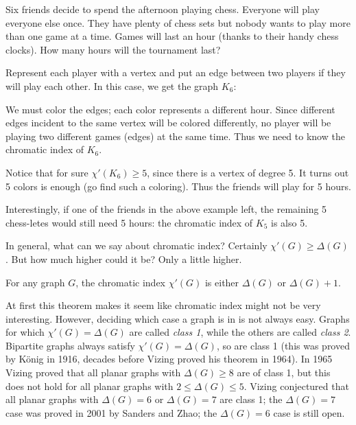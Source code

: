 \documentclass[12pt]{article}
\begin{document}
\begin{example}
Six friends decide to spend the afternoon playing chess.  Everyone will play everyone else once.  They have plenty of chess sets but nobody wants to play more than one game at a time.  Games will last an hour (thanks to their handy chess clocks).  How many hours will the tournament last?

\begin{solution}
Represent each player with a vertex and put an edge between two players if they will play each other.  In this case, we get the graph $K_6$:

\begin{center}
\end{center}

We must color the edges; each color represents a different hour.  Since different edges incident to the same vertex will be colored differently, no player will be playing two different games (edges) at the same time.  Thus we need to know the chromatic index of $K_6$.

Notice that for sure $\chi'(K_6) \ge 5$, since there is a vertex of degree 5. It turns out 5 colors is enough (go find such a coloring).  Thus the friends will play for 5 hours.  
\end{solution} 
\end{example}

Interestingly, if one of the friends in the above example left, the remaining 5 chess-letes would still need 5 hours: the chromatic index of $K_5$ is also 5.  

In general, what can we say about chromatic index?  Certainly $\chi'(G) \ge \Delta(G)$.  But how much higher could it be?  Only a little higher.

\begin{theorem}
For any graph $G$, the chromatic index $\chi'(G)$ is either $\Delta(G)$ or $\Delta(G) + 1$.
\end{theorem}

At first this theorem makes it seem like chromatic index might not be very interesting.  However, deciding which case a graph is in is not always easy.  Graphs for which $\chi'(G) = \Delta(G)$ are called \emph{class 1}, while the others are called \emph{class 2}. Bipartite graphs always satisfy $\chi'(G) = \Delta(G)$, so are class 1 (this was proved by K\"onig in 1916, decades before Vizing proved his theorem in 1964).  In 1965 Vizing proved that all planar graphs with $\Delta(G) \ge 8$ are of class 1, but this does not hold for all planar graphs with $2 \le \Delta(G) \le 5$.  Vizing conjectured that all planar graphs with $\Delta(G) = 6$ or $\Delta(G) = 7$ are class 1; the $\Delta(G) = 7$ case was proved in 2001 by Sanders and Zhao; the $\Delta(G) = 6$ case is still open.
\end{document}
